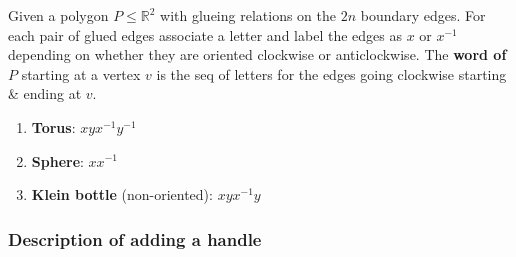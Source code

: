 \documentclass{article}
\begin{document}
\begin{definition}
    Given a polygon $P \le \mathbb{R}^2$ with glueing relations on the $2n$ boundary edges. For each pair of glued edges associate a letter and label the edges as $x$ or $x^{-1}$ depending on whether they are oriented clockwise or anticlockwise.
    The \textbf{word of $P$} starting at a vertex $v$ is the seq of letters for the edges going clockwise starting \& ending at $v$.
\end{definition}

\begin{example}
    \begin{enumerate}[(1)]
        \item \textbf{Torus}: $xyx^{-1}y^{-1}$
        \item \textbf{Sphere}: $xx^{-1}$
        \item \textbf{Klein bottle} (non-oriented): $xyx^{-1}y$
    \end{enumerate}
\end{example}

\subsubsection*{Description of adding a handle}
\end{document}
